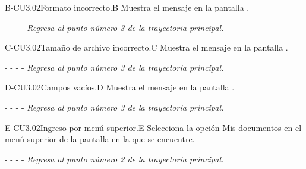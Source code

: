 	
	\begin{UCtrayectoriaA}{B-CU3.02}{Formato incorrecto.}{B}
	    \UCpaso[\UCsist]Muestra el mensaje  en la pantalla .
	    \item[- -] - - {\em Regresa al punto número 3 de la trayectoria principal.}
	\end{UCtrayectoriaA}

	\begin{UCtrayectoriaA}{C-CU3.02}{Tamaño de archivo incorrecto.}{C}
	    \UCpaso[\UCsist]Muestra el mensaje  en la pantalla .
	    \item[- -] - - {\em Regresa al punto número 3 de la trayectoria principal.}
	\end{UCtrayectoriaA}
	
	\begin{UCtrayectoriaA}{D-CU3.02}{Campos vacíos.}{D}
	    \UCpaso[\UCsist]Muestra el mensaje en la pantalla .
	    \item[- -] - - {\em Regresa al punto número 3 de la trayectoria principal.}
	\end{UCtrayectoriaA}
	\begin{UCtrayectoriaA}{E-CU3.02}{Ingreso por menú superior.}{E}
	    \UCpaso[\UCactor] Selecciona la opción Mis documentos en el menú superior de la pantalla en la que se encuentre.
	
	    \item[- -] - - {\em Regresa al punto número 2 de la trayectoria principal.}
	\end{UCtrayectoriaA}
	

	